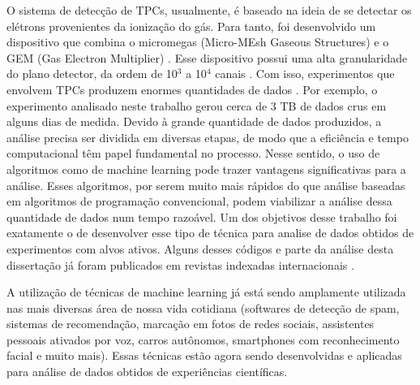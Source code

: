 \documentclass[a4paper,12pt,oneside]{book}
\begin{document}
\par O sistema de detecção de TPCs, usualmente, é baseado na ideia de se detectar os elétrons provenientes da ionização do gás. Para tanto, foi desenvolvido um dispositivo que combina o micromegas (Micro-MEsh Gaseous Structures) \cite{micromegas} e o GEM (Gas Electron Multiplier) \cite{GET}. Esse dispositivo possui uma alta granularidade do plano detector, da ordem de 10$^3$ a 10$^4$ canais \cite{FORTINO2022166497}. Com isso, experimentos que envolvem TPCs produzem enormes quantidades de dados \cite{attpc, pattpc}. Por exemplo, o experimento analisado neste trabalho gerou cerca de 3 TB de dados crus em alguns dias de medida. Devido à grande quantidade de dados produzidos, a análise precisa ser dividida em diversas etapas, de modo que a eficiência e tempo computacional têm papel fundamental no processo. Nesse sentido, o uso de algoritmos como de machine learning pode trazer vantagens significativas para a análise. Esses algoritmos, por serem muito mais rápidos do que análise baseadas em algoritmos de programação convencional, podem viabilizar a análise dessa quantidade de dados num tempo razoável. Um dos objetivos desse trabalho foi exatamente o de desenvolver esse tipo de técnica para analise de dados obtidos de experimentos com alvos ativos. Alguns desses códigos e parte da análise desta dissertação já foram publicados em revistas indexadas internacionais \cite{FORTINO2022166497, artigo}.



\par A utilização de técnicas de machine learning já está sendo amplamente utilizada nas mais diversas área de nossa vida cotidiana (softwares de detecção de spam, sistemas de recomendação, marcação em fotos de redes sociais, assistentes pessoais ativados por voz, carros autônomos, smartphones com reconhecimento facial e muito mais). Essas técnicas estão agora sendo desenvolvidas e aplicadas para análise de dados obtidos de experiências científicas.
\end{document}
